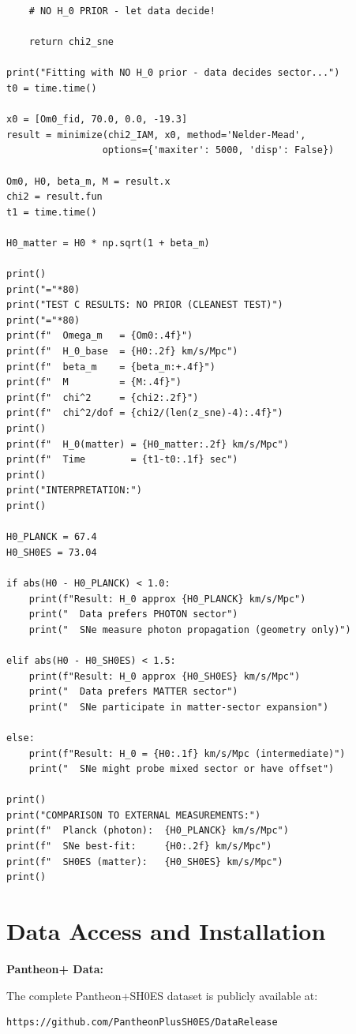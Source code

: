 \documentclass[twocolumn,superscriptaddress,prd,amsmath,amssymb]{revtex4-2}
\begin{document}
\begin{lstlisting}
    # NO H_0 PRIOR - let data decide!
    
    return chi2_sne

print("Fitting with NO H_0 prior - data decides sector...")
t0 = time.time()

x0 = [Om0_fid, 70.0, 0.0, -19.3]
result = minimize(chi2_IAM, x0, method='Nelder-Mead',
                 options={'maxiter': 5000, 'disp': False})

Om0, H0, beta_m, M = result.x
chi2 = result.fun
t1 = time.time()

H0_matter = H0 * np.sqrt(1 + beta_m)

print()
print("="*80)
print("TEST C RESULTS: NO PRIOR (CLEANEST TEST)")
print("="*80)
print(f"  Omega_m   = {Om0:.4f}")
print(f"  H_0_base  = {H0:.2f} km/s/Mpc")
print(f"  beta_m    = {beta_m:+.4f}")
print(f"  M         = {M:.4f}")
print(f"  chi^2     = {chi2:.2f}")
print(f"  chi^2/dof = {chi2/(len(z_sne)-4):.4f}")
print()
print(f"  H_0(matter) = {H0_matter:.2f} km/s/Mpc")
print(f"  Time        = {t1-t0:.1f} sec")
print()
print("INTERPRETATION:")
print()

H0_PLANCK = 67.4
H0_SH0ES = 73.04

if abs(H0 - H0_PLANCK) < 1.0:
    print(f"Result: H_0 approx {H0_PLANCK} km/s/Mpc")
    print("  Data prefers PHOTON sector")
    print("  SNe measure photon propagation (geometry only)")
    
elif abs(H0 - H0_SH0ES) < 1.5:
    print(f"Result: H_0 approx {H0_SH0ES} km/s/Mpc")
    print("  Data prefers MATTER sector")
    print("  SNe participate in matter-sector expansion")
    
else:
    print(f"Result: H_0 = {H0:.1f} km/s/Mpc (intermediate)")
    print("  SNe might probe mixed sector or have offset")

print()
print("COMPARISON TO EXTERNAL MEASUREMENTS:")
print(f"  Planck (photon):  {H0_PLANCK} km/s/Mpc")
print(f"  SNe best-fit:     {H0:.2f} km/s/Mpc")
print(f"  SH0ES (matter):   {H0_SH0ES} km/s/Mpc")
print()
\end{lstlisting}

\section{Data Access and Installation}
\label{app:data}

\textbf{Pantheon+ Data:}

The complete Pantheon+SH0ES dataset is publicly available at:
\begin{verbatim}
https://github.com/PantheonPlusSH0ES/DataRelease
\end{verbatim}
\end{document}

